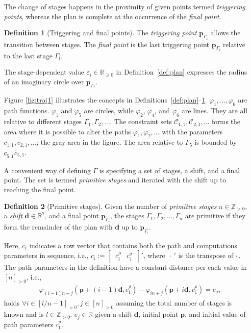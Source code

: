 \documentclass[letterpaper,10pt,journal,twoside]{IEEEtran}
\theoremstyle{definition}
\newtheorem{defn}{Definition}[section]
\begin{document}
The change of stages happens in the proximity of given points termed \emph{triggering points}, whereas the plan is complete at the occurrence of the \emph{final point}.

\begin{defn}[Triggering and final points]
  \label{def:trigs}
  The \emph{triggering point} $\mathbf{p}_{\Gamma_{i}}$ allows the transition between stages. The \emph{final point} is the last triggering point $\mathbf{p}_{\Gamma_{l}}$ relative to the last stage $\Gamma_l$.
\end{defn}

The stage-dependent value $\varepsilon_i\in\mathbb{R}_{\geq 0}$ in Definition~\ref{def:plan} expresses the radius of an imaginary circle over $\mathbf{p}_{\Gamma_i}$.

Figure \ref{fig:traj1} illustrates the concepts in Definitions~\ref{def:plan}--\ref{def:trigs}. $\varphi_1,\dots,\varphi_6$ are path functions. $\varphi_1$ and $\varphi_5$ are circles, while $\varphi_2$, $\varphi_4$, and $\varphi_6$ are lines. They are all relative to different stages $\Gamma_1,\Gamma_2,\dots$. The constraint sets $\mathcal{C}_{1,1},\mathcal{C}_{2,1},\dots$ forms the area where it is possible to alter the paths $\varphi_1,\varphi_2,\dots$ with the parameters $c_{1,1},c_{2,1},\dots$; the gray area in the figure. The area relative to $\Gamma_5$ is bounded by $\underline{c}_{5,1}\overline{c}_{5,1}$.

A convenient way of defining $\Gamma$ is specifying a set of stages, a shift, and a final point. The set is termed \emph{primitive stages} and iterated with the shift up to reaching the final point.

\begin{defn}[Primitive stages]
  \label{def:primitive}
  Given the number of \emph{primitive stages} $n\in\mathbb{Z}_{>0}$, a \emph{shift} $\mathbf{d}\in\mathbb{R}^2$, and a final point $\mathbf{p}_{\Gamma_l}$, the stages $\Gamma_1,\Gamma_2,\dots,\Gamma_n$ %
  are primitive if they form the remainder of the plan with $\mathbf{d}$ up to $\mathbf{p}_{\Gamma_l}$. 
\end{defn}

Here, $c_i$ indicates a row vector that contains both the path and computations parameters in sequence, i.e., $c_i:=[\begin{matrix}\,c_i^\rho & c_i^\sigma\,\end{matrix}]'$, where $\,\cdot\,'$ is the transpose of $\cdot\,$. The path parameters in the definition have a constant distance per each value in $[n]_{>0}$, i.e., 
\begin{equation}\label{eq:primitive}\begin{split}
  &\varphi_{(i-1)n+j}(\mathbf{p}+(i-1)\mathbf{d},c_1^\rho)-\varphi_{in+j}(\mathbf{p}+i\mathbf{d},c_1^\rho)=e_j,
\end{split}\end{equation}
holds $\forall i\in[l/n-1]_{>0},j\in[n]_{>0}$ assuming the total number of stages is known and is $l\in\mathbb{Z}_{>0}$. $e_j\in\mathbb{R}$ given a shift $\mathbf{d}$, initial point $\mathbf{p}$, and initial value of path parameters $c_1^\rho$.
\end{document}
